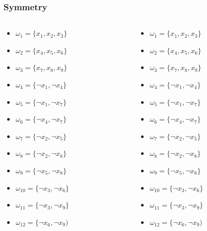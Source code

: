 \documentclass{beamer}
\begin{document}
\begin{frame}
	\frametitle{Symmetry}
	\scriptsize
	 \begin{columns}[t]
		\begin{column}[T]{.3\textwidth}
		\scriptsize
		\begin{itemize} 
		\item[] $\omega_{1} = \{x_1  ,  x_2  ,  x_3\}$
		\item[] $\omega_{2} = \{x_4  ,  x_5  ,  x_6\} $
		\item[] $\omega_{3} = \{x_7  ,  x_8  ,  x_9\} $
		\item[] $\omega_{4} = \{\neg x_1  ,  \neg x_4\} $
		\item[] $\omega_{5} = \{\neg x_1  ,  \neg x_7\} $
		\item[] $\omega_{6} = \{\neg x_4  ,  \neg x_7\} $
		\item[] $\omega_{7} = \{\neg x_2  ,  \neg x_5\} $
		\item[] $\omega_{8} = \{\neg x_2  ,  \neg x_8\} $
		\item[] $\omega_{9} = \{\neg x_5  ,  \neg x_8\} $
		\item[] $\omega_{10} = \{\neg x_3  ,  \neg x_6\} $
		\item[] $\omega_{11} = \{\neg x_3  ,  \neg x_9\} $
		\item[] $\omega_{12} = \{\neg x_6  ,  \neg x_9) $
		\end{itemize}
		\end{column}
		\begin{column}[T]{.3\textwidth}
		\scriptsize
		\begin{itemize} 
		\item[] $\omega_{1} = \{x_1  ,  x_2  ,  x_3\}$
		\item[] $\omega_{2} = \{x_4  ,  x_5  ,  x_6\} $
		\item[] $\omega_{3} = \{x_7  ,  x_8  ,  x_9\} $
		\item[] $\omega_{4} = \{\neg x_1  ,  \neg x_4\} $
		\item[] $\omega_{5} = \{\neg x_1  ,  \neg x_7\} $
		\item[] $\omega_{6} = \{\neg x_4  ,  \neg x_7\} $
		\item[] $\omega_{7} = \{\neg x_2  ,  \neg x_5\} $
		\item[] $\omega_{8} = \{\neg x_2  ,  \neg x_8\} $
		\item[] $\omega_{9} = \{\neg x_5  ,  \neg x_8\} $
		\item[] $\omega_{10} = \{\neg x_3  ,  \neg x_6\} $
		\item[] $\omega_{11} = \{\neg x_3  ,  \neg x_9\} $
		\item[] $\omega_{12} = \{\neg x_6  ,  \neg x_9) $
	\end{itemize}
	\end{column}
\end{columns}


\end{frame}
\end{document}
